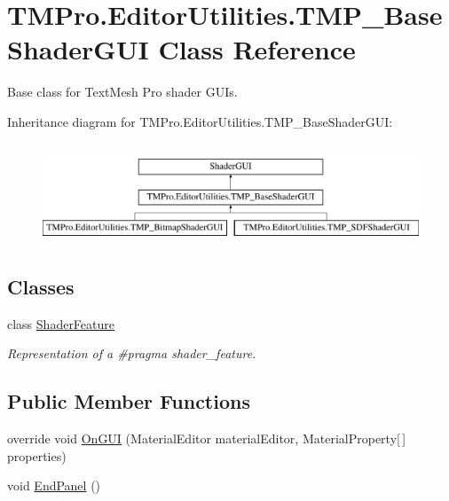 \hypertarget{class_t_m_pro_1_1_editor_utilities_1_1_t_m_p___base_shader_g_u_i}{}\section{T\+M\+Pro.\+Editor\+Utilities.\+T\+M\+P\+\_\+\+Base\+Shader\+G\+UI Class Reference}
\label{class_t_m_pro_1_1_editor_utilities_1_1_t_m_p___base_shader_g_u_i}


Base class for Text\+Mesh Pro shader G\+U\+Is.  


Inheritance diagram for T\+M\+Pro.\+Editor\+Utilities.\+T\+M\+P\+\_\+\+Base\+Shader\+G\+UI\+:\begin{figure}[H]
\begin{center}
\leavevmode
\includegraphics[height=3.000000cm]{class_t_m_pro_1_1_editor_utilities_1_1_t_m_p___base_shader_g_u_i}
\end{center}
\end{figure}
\subsection*{Classes}
\begin{DoxyCompactItemize}
\item 
class \mbox{\hyperlink{class_t_m_pro_1_1_editor_utilities_1_1_t_m_p___base_shader_g_u_i_1_1_shader_feature}{Shader\+Feature}}
\begin{DoxyCompactList}\small\item\em Representation of a \#pragma shader\+\_\+feature. \end{DoxyCompactList}\end{DoxyCompactItemize}
\subsection*{Public Member Functions}
\begin{DoxyCompactItemize}
\item 
override void \mbox{\hyperlink{class_t_m_pro_1_1_editor_utilities_1_1_t_m_p___base_shader_g_u_i_a54fd1ffc1f5f8d62f4475a94b9d1942c}{On\+G\+UI}} (Material\+Editor material\+Editor, Material\+Property\mbox{[}$\,$\mbox{]} properties)
\item 
void \mbox{\hyperlink{class_t_m_pro_1_1_editor_utilities_1_1_t_m_p___base_shader_g_u_i_ae4663303cae2be2a85d7e82475743902}{End\+Panel}} ()
\end{DoxyCompactItemize}
